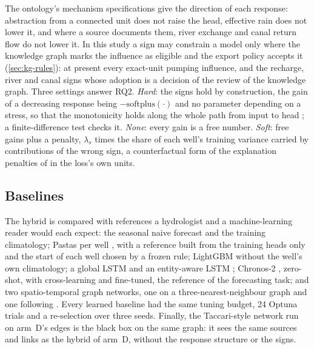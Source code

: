 The ontology's mechanism specifications give the direction of each response: abstraction from a
connected unit does not raise the head, effective rain does not lower it, and where a source
documents them, river exchange and canal return flow do not lower it. In this study a sign may
constrain a model only where the knowledge graph marks the influence as eligible and the export
policy accepts it (\cref{sec:kg-rules}): at present every exact-unit pumping influence, and the
recharge, river and canal signs whose adoption is a decision of the review of the knowledge graph.
Three settings answer RQ2. \emph{Hard}: the signs hold by construction, the gain of a decreasing
response being $-\mathrm{softplus}(\cdot)$ and no parameter depending on a stress, so that the
monotonicity holds along the whole path from input to head \citep{Runje2023Constrained}; a
finite-difference test checks it. \emph{None}: every gain is a free number. \emph{Soft}: free
gains plus a penalty, $\lambda_s$ times the share of each well's training variance carried by
contributions of the wrong sign, a counterfactual form of the explanation penalties of
\citet{Ross2017Righta} in the loss's own units. %

\subsection{Baselines}\label{sec:baselines}

The hybrid is compared with references a hydrologist and a machine-learning reader would each
expect: the seasonal naive forecast and the training climatology; Pastas per well
\citep{Collenteur2019Pastas}, with a reference built from the training heads only and the start of
each well chosen by a frozen rule; LightGBM \citep{Ke2017Lightgbm} without the well's own
climatology; a global LSTM \citep{Hochreiter1997Long,Wunsch2021Groundwater} and an entity-aware
LSTM \citep{Kratzert2019Towards}; Chronos-2 \citep{Ansari2025Chronos}, zero-shot, with
cross-learning and fine-tuned, the reference of the forecasting task; and two spatio-temporal graph
networks, one on a three-nearest-neighbour graph and one following \citet{Taccari2024Spatial}.
Every learned baseline had the same tuning budget, 24 Optuna trials \citep{Akiba2019Optuna} and a
re-selection over three seeds. Finally, the Taccari-style network run on arm~D's edges is the
black box on the same graph: it sees the same sources and links as the hybrid of arm~D, without
the response structure or the signs. %
